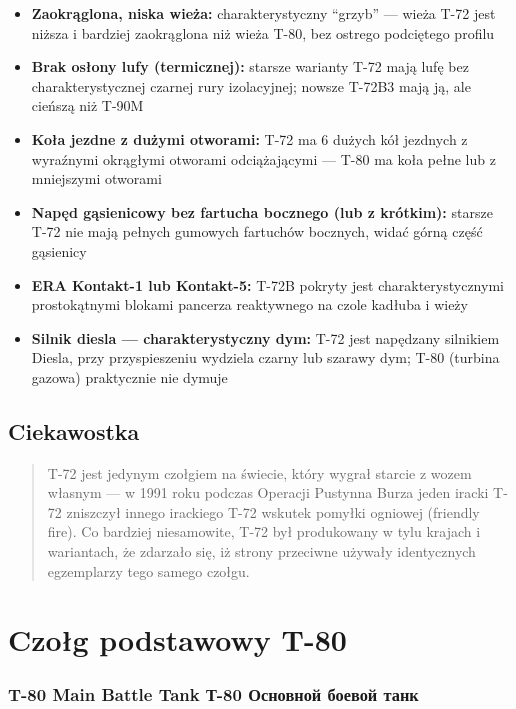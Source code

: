 \documentclass[12pt,openany,oneside]{book}
\providecommand{\tightlist}{%
  \setlength{\itemsep}{0pt}\setlength{\parskip}{0pt}}
\begin{document}
\begin{itemize}
\tightlist
\item
  \textbf{Zaokrąglona, niska wieża:} charakterystyczny ``grzyb'' ---
  wieża T-72 jest niższa i bardziej zaokrąglona niż wieża T-80, bez
  ostrego podciętego profilu
\item
  \textbf{Brak osłony lufy (termicznej):} starsze warianty T-72 mają
  lufę bez charakterystycznej czarnej rury izolacyjnej; nowsze T-72B3
  mają ją, ale cieńszą niż T-90M
\item
  \textbf{Koła jezdne z dużymi otworami:} T-72 ma 6 dużych kół jezdnych
  z wyraźnymi okrągłymi otworami odciążającymi --- T-80 ma koła pełne
  lub z mniejszymi otworami
\item
  \textbf{Napęd gąsienicowy bez fartucha bocznego (lub z krótkim):}
  starsze T-72 nie mają pełnych gumowych fartuchów bocznych, widać górną
  część gąsienicy
\item
  \textbf{ERA Kontakt-1 lub Kontakt-5:} T-72B pokryty jest
  charakterystycznymi prostokątnymi blokami pancerza reaktywnego na
  czole kadłuba i wieży
\item
  \textbf{Silnik diesla --- charakterystyczny dym:} T-72 jest napędzany
  silnikiem Diesla, przy przyspieszeniu wydziela czarny lub szarawy dym;
  T-80 (turbina gazowa) praktycznie nie dymuje
\end{itemize}

\section{Ciekawostka}\label{ciekawostka}

\begin{quote}
T-72 jest jedynym czołgiem na świecie, który wygrał starcie z wozem
własnym --- w 1991 roku podczas Operacji Pustynna Burza jeden iracki
T-72 zniszczył innego irackiego T-72 wskutek pomyłki ogniowej (friendly
fire). Co bardziej niesamowite, T-72 był produkowany w tylu krajach i
wariantach, że zdarzało się, iż strony przeciwne używały identycznych
egzemplarzy tego samego czołgu.
\end{quote}

\chapter{Czołg podstawowy T-80}\label{czoux142g-podstawowy-t-80}

\subsection{T-80 Main Battle Tank \textbar{} Т-80 Основной боевой
танк}\label{t-80-main-battle-tank-ux442-80-ux43eux441ux43dux43eux432ux43dux43eux439-ux431ux43eux435ux432ux43eux439-ux442ux430ux43dux43a}
\end{document}
